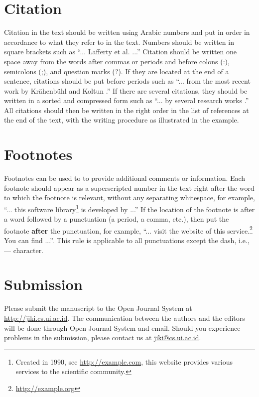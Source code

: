 \documentclass[conference, compsoc, twoside]{IEEEtran}
\begin{document}
\section{Citation}
Citation in the text should be written using Arabic numbers and put in order in accordance to what they refer to in the text. Numbers should be written in square brackets such as ``... Lafferty et al. \cite{Lafferty:2001:CRF:645530.655813} ...'' Citation should be written one space away from the words after commas or periods and before colons (:), semicolons (;), and question marks (?). If they are located at the end of a sentence, citations should be put before periods such as ``... from the most recent work by Kr\"{a}henb\"{u}hl and Koltun \cite{NIPS2011_4296}.'' If there are several citations, they should be written in a sorted and compressed form such as ``... by several research works \cite{Lafferty:2001:CRF:645530.655813,10.1109/TPAMI.2011.231,article.ChenPKMY14,article.farabet} .'' All citations should then be written in the right order in the list of references at the end of the text, with the writing procedure as illustrated in the example.

\section{Footnotes}
Footnotes can be used to to provide additional comments or information. Each footnote should appear as a superscripted number in the text right after the word to which the footnote is relevant, without any separating whitespace, for example, ``... this software library\footnote{Created in 1990, see \url{http://example.com}, this website provides various services to the scientific community.} is developed by ...'' If the location of the footnote is after a word followed by a punctuation (a period, a comma, etc.), then put the footnote \textbf{after} the punctuation, for example, ``... visit the website of this service.\footnote{\url{http://example.org}} You can find ...''. This rule is applicable to all punctuations except the dash, i.e., --- character. 

\section{Submission}
Please submit the manuscript to the Open Journal System at \url{http://jiki.cs.ui.ac.id}. The communication between the authors and the editors will be done through Open Journal System and email. Should you experience problems in the submission, please contact us at \url{jiki@cs.ui.ac.id}.
\end{document}
